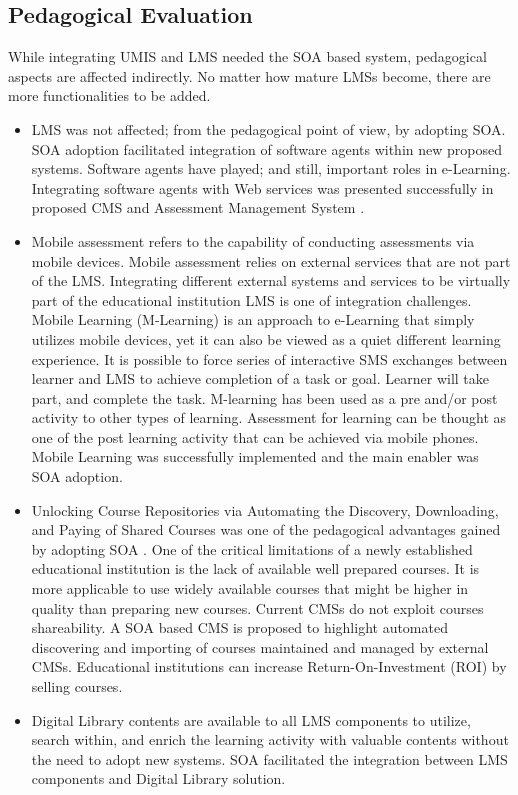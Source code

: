 \documentclass[12pt,a4paper,final,twoside,onecolumn,titlepage]{book}
\begin{document}
\subsection{Pedagogical Evaluation}
While integrating \gls{UMIS} and \gls{LMS} needed the \gls{SOA} based system, pedagogical aspects are affected indirectly. No matter how mature \gls{LMS}s become, there are more functionalities to be added.
\begin{itemize}
\item \gls{LMS} was not affected; from the pedagogical point of view, by adopting \gls{SOA}. \gls{SOA} adoption facilitated integration of software agents within new proposed systems. Software agents have played; and still, important roles in e-Learning. Integrating software agents with Web services was presented successfully in proposed \gls{CMS} \cite{EV10} and Assessment Management System \cite{EV10}.
\item Mobile assessment refers to the capability of conducting assessments via mobile devices. Mobile assessment relies on external services that are not part of the \gls{LMS}. Integrating different external systems and services to be virtually part of the educational institution \gls{LMS} is one of integration challenges. Mobile Learning (M-Learning) is an approach to e-Learning that simply utilizes mobile devices, yet it can also be viewed as a quiet different learning experience. It is possible to force series of interactive SMS exchanges between learner and \gls{LMS} to achieve completion of a task or goal. Learner will take part, and complete the task. M-learning has been used as a pre and/or post activity to other types of learning. Assessment for learning can be thought as one of the post learning activity that can be achieved via mobile phones. Mobile Learning was successfully implemented and the main enabler was \gls{SOA} adoption.
\item Unlocking Course Repositories via Automating the Discovery, Downloading, and Paying of Shared Courses was one of the pedagogical advantages gained by adopting \gls{SOA} \cite{EV09}. One of the critical limitations of a newly established educational institution is the lack of available well prepared courses. It is more applicable to use widely available courses that might be higher in quality than preparing new courses. Current \gls{CMS}s do not exploit courses shareability. A \gls{SOA} based \gls{CMS} is proposed to highlight automated discovering and importing of courses maintained and managed by external \gls{CMS}s. Educational institutions can increase Return-On-Investment (ROI) by selling courses.
\item Digital Library contents are available to all \gls{LMS} components to utilize, search within, and enrich the learning activity with valuable contents without the need to adopt new systems. \gls{SOA} facilitated the integration between \gls{LMS} components and Digital Library solution.
\end{itemize}
\end{document}
